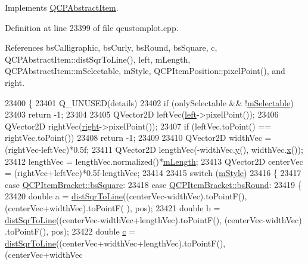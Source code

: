 Implements \hyperlink{class_q_c_p_abstract_item_a96d522d10ffc0413b9a366c6f7f0476b}{Q\+C\+P\+Abstract\+Item}.



Definition at line 23399 of file qcustomplot.\+cpp.



References bs\+Calligraphic, bs\+Curly, bs\+Round, bs\+Square, c, Q\+C\+P\+Abstract\+Item\+::dist\+Sqr\+To\+Line(), left, m\+Length, Q\+C\+P\+Abstract\+Item\+::m\+Selectable, m\+Style, Q\+C\+P\+Item\+Position\+::pixel\+Point(), and right.


\begin{DoxyCode}
23400 \{
23401   Q\_UNUSED(details)
23402   if (onlySelectable && !\hyperlink{class_q_c_p_abstract_item_ad81eb35c8726a0f458db9df9732e0e41}{mSelectable})
23403     return -1;
23404   
23405   QVector2D leftVec(\hyperlink{class_q_c_p_item_bracket_af6cc6d27d96171778c6927d6edce48b0}{left}->pixelPoint());
23406   QVector2D rightVec(\hyperlink{class_q_c_p_item_bracket_afa6c1360b05a50c4e0df37b3cebab6be}{right}->pixelPoint());
23407   if (leftVec.toPoint() == rightVec.toPoint())
23408     return -1;
23409   
23410   QVector2D widthVec = (rightVec-leftVec)*0.5f;
23411   QVector2D lengthVec(-widthVec.\hyperlink{_comparision_pictures_2_createtest_image_8m_a2fb1c5cf58867b5bbc9a1b145a86f3a0}{y}(), widthVec.\hyperlink{_comparision_pictures_2_createtest_image_8m_a9336ebf25087d91c818ee6e9ec29f8c1}{x}());
23412   lengthVec = lengthVec.normalized()*\hyperlink{class_q_c_p_item_bracket_ab3d99bba8da18eb4d0e0cb23dded33b2}{mLength};
23413   QVector2D centerVec = (rightVec+leftVec)*0.5f-lengthVec;
23414   
23415   switch (\hyperlink{class_q_c_p_item_bracket_ac911907184c824d621f274f8e0990080}{mStyle})
23416   \{
23417     \textcolor{keywordflow}{case} \hyperlink{class_q_c_p_item_bracket_a7ac3afd0b24a607054e7212047d59dbda7f9df4a7359bfe3dac1dbe4ccf5d220c}{QCPItemBracket::bsSquare}:
23418     \textcolor{keywordflow}{case} \hyperlink{class_q_c_p_item_bracket_a7ac3afd0b24a607054e7212047d59dbda394627b0830a26ee3e0a02ca67a9f918}{QCPItemBracket::bsRound}:
23419     \{
23420       \textcolor{keywordtype}{double} a = \hyperlink{class_q_c_p_abstract_item_acdca343717d625b8abb3c3e38c0ed39d}{distSqrToLine}((centerVec-widthVec).toPointF(), (centerVec+widthVec).toPointF(
      ), pos);
23421       \textcolor{keywordtype}{double} b = \hyperlink{class_q_c_p_abstract_item_acdca343717d625b8abb3c3e38c0ed39d}{distSqrToLine}((centerVec-widthVec+lengthVec).toPointF(), (centerVec-widthVec)
      .toPointF(), pos);
23422       \textcolor{keywordtype}{double} \hyperlink{_comparision_pictures_2_createtest_image_8m_ae0323a9039add2978bf5b49550572c7c}{c} = \hyperlink{class_q_c_p_abstract_item_acdca343717d625b8abb3c3e38c0ed39d}{distSqrToLine}((centerVec+widthVec+lengthVec).toPointF(), (centerVec+widthVec

\end{DoxyCode}
